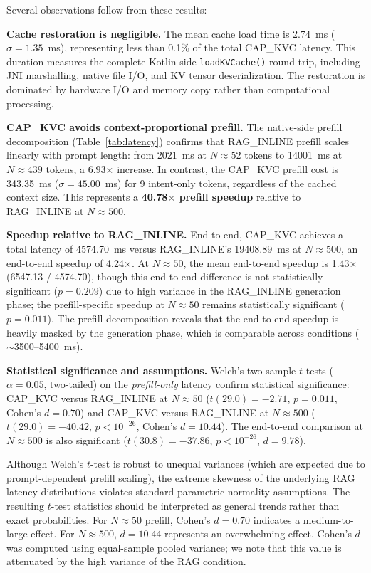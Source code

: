 \documentclass[journal]{IEEEtran}
\begin{document}
Several observations follow from these results:

\textbf{Cache restoration is negligible.} The mean cache load time is 2.74~ms ($\sigma = 1.35$~ms), representing less than 0.1\% of the total CAP\_KVC latency. This duration measures the complete Kotlin-side \texttt{loadKVCache()} round trip, including JNI marshalling, native file I/O, and KV tensor deserialization. The restoration is dominated by hardware I/O and memory copy rather than computational processing.

\textbf{CAP\_KVC avoids context-proportional prefill.} The native-side prefill decomposition (Table~\ref{tab:latency}) confirms that RAG\_INLINE prefill scales linearly with prompt length: from 2021~ms at $N \approx 52$ tokens to 14001~ms at $N \approx 439$ tokens, a 6.93$\times$ increase. In contrast, the CAP\_KVC prefill cost is 343.35~ms ($\sigma = 45.00$~ms) for 9 intent-only tokens, regardless of the cached context size. This represents a \textbf{40.78$\times$ prefill speedup} relative to RAG\_INLINE at $N \approx 500$.

\textbf{Speedup relative to RAG\_INLINE.} End-to-end, CAP\_KVC achieves a total latency of 4574.70~ms versus RAG\_INLINE's 19408.89~ms at $N \approx 500$, an end-to-end speedup of 4.24$\times$. At $N \approx 50$, the mean end-to-end speedup is 1.43$\times$ (6547.13 / 4574.70), though this end-to-end difference is not statistically significant ($p = 0.209$) due to high variance in the RAG\_INLINE generation phase; the prefill-specific speedup at $N \approx 50$ remains statistically significant ($p = 0.011$). The prefill decomposition reveals that the end-to-end speedup is heavily masked by the generation phase, which is comparable across conditions ($\sim$3500--5400~ms).

\textbf{Statistical significance and assumptions.} Welch's two-sample $t$-tests ($\alpha = 0.05$, two-tailed) on the \emph{prefill-only} latency confirm statistical significance: CAP\_KVC versus RAG\_INLINE at $N \approx 50$ ($t(29.0) = -2.71$, $p = 0.011$, Cohen's $d = 0.70$) and CAP\_KVC versus RAG\_INLINE at $N \approx 500$ ($t(29.0) = -40.42$, $p < 10^{-26}$, Cohen's $d = 10.44$). The end-to-end comparison at $N \approx 500$ is also significant ($t(30.8) = -37.86$, $p < 10^{-26}$, $d = 9.78$). 

Although Welch's $t$-test is robust to unequal variances (which are expected due to prompt-dependent prefill scaling), the extreme skewness of the underlying RAG latency distributions violates standard parametric normality assumptions. The resulting $t$-test statistics should be interpreted as general trends rather than exact probabilities. For $N \approx 50$ prefill, Cohen's $d = 0.70$ indicates a medium-to-large effect. For $N \approx 500$, $d = 10.44$ represents an overwhelming effect. Cohen's $d$ was computed using equal-sample pooled variance; we note that this value is attenuated by the high variance of the RAG condition.
\end{document}
